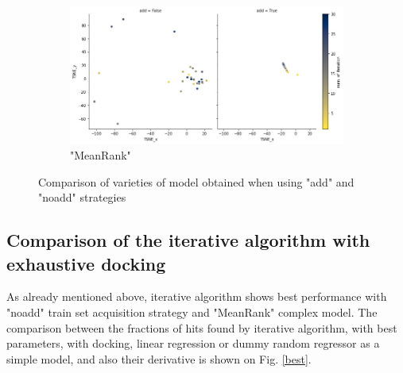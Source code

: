 \begin{figure}
\begin{subfigure}{\textwidth}
\centering
\includegraphics[scale = 0.50]{Images/MRtsne.jpg}
\caption{"MeanRank"}
\end{subfigure}
\caption{Comparison of varieties of model obtained when using "add" and "noadd" strategies}
\label{tsne}
\end{figure}



\subsection{Comparison of the iterative algorithm with exhaustive docking}

As already mentioned above, iterative algorithm shows best performance with "noadd" train set acquisition strategy and "MeanRank" complex model.
The comparison between the fractions of hits found by iterative algorithm, with best parameters, with docking,  linear regression or dummy random regressor as a simple model, and also their derivative is shown on Fig. \ref{best}. 


